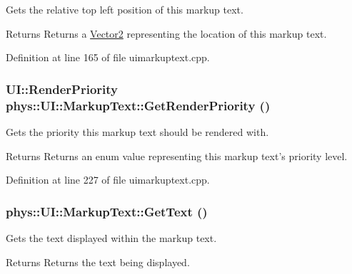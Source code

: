 Gets the relative top left position of this markup text. 

\begin{DoxyReturn}{Returns}
Returns a \hyperlink{classphys_1_1Vector2}{Vector2} representing the location of this markup text. 
\end{DoxyReturn}


Definition at line 165 of file uimarkuptext.cpp.

\hypertarget{classphys_1_1UI_1_1MarkupText_a86afb23309534d86ed9675170b321874}{
\subsubsection[{GetRenderPriority}]{\setlength{\rightskip}{0pt plus 5cm}UI::RenderPriority phys::UI::MarkupText::GetRenderPriority ()}}
\label{d7/d23/classphys_1_1UI_1_1MarkupText_a86afb23309534d86ed9675170b321874}


Gets the priority this markup text should be rendered with. 

\begin{DoxyReturn}{Returns}
Returns an enum value representing this markup text's priority level. 
\end{DoxyReturn}


Definition at line 227 of file uimarkuptext.cpp.

\hypertarget{classphys_1_1UI_1_1MarkupText_af5d8a7e6ca03e15fc488608c28a54c1e}{
\subsubsection[{GetText}]{ phys::UI::MarkupText::GetText ()}}
\label{d7/d23/classphys_1_1UI_1_1MarkupText_af5d8a7e6ca03e15fc488608c28a54c1e}


Gets the text displayed within the markup text. 

\begin{DoxyReturn}{Returns}
Returns the text being displayed. 
\end{DoxyReturn}


